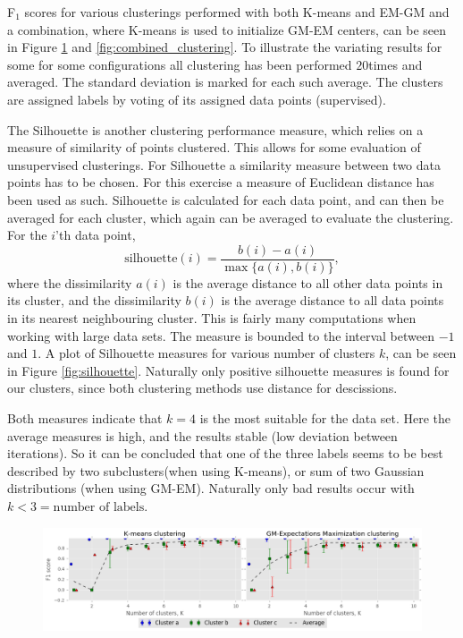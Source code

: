 \documentclass[a4paper,10pt,article,oneside,english]{memoir}
\let\oldcaption\caption
\renewcommand{\caption}[1]{\oldcaption{\emph{#1}}}
\begin{document}
F$_1$ scores for various clusterings performed with both K-means and EM-GM and a combination, where K-means is used to initialize GM-EM centers, can be seen in Figure \ref{fig:f1} and \ref{fig:combined_clustering}. To illustrate the variating results for some for some configurations all clustering has been performed $20$times and averaged. The standard deviation is marked for each such average. The clusters are assigned labels by voting of its assigned data points (supervised).


The Silhouette is another clustering performance measure, which relies on a measure of similarity of points clustered. This allows for some evaluation of unsupervised clusterings. For Silhouette a similarity measure between two data points has to be chosen. For this exercise a measure of Euclidean distance has been used as such. Silhouette is calculated for each data point, and can then be averaged for each cluster, which again can be averaged to evaluate the clustering. For the $i$'th data point,
$$ \text{silhouette}(i) = \frac{b(i) - a(i)}{\max\{a(i), b(i)\}},$$
where the dissimilarity $a(i)$ is the average distance to all other data points in its cluster, and the dissimilarity $b(i)$ is the average distance to all data points in its nearest neighbouring cluster. This is fairly many computations when working with large data sets. The measure is bounded to the interval between $-1$ and $1$. A plot of Silhouette measures for various number of clusters $k$, can be seen in Figure \ref{fig:silhouette}. Naturally only positive silhouette measures is found for our clusters, since both clustering methods use distance for descissions. 

Both measures indicate that $k=4$ is the most suitable for the data set. Here the average measures is high, and the results stable (low deviation between iterations). So it can be concluded that one of the three labels seems to be best described by two subclusters(when using K-means), or sum of two Gaussian distributions (when using GM-EM). Naturally only bad results occur with $k<3=\text{number of labels}$. 

\begin{figure}
	\centering
	\includegraphics[width=\textwidth]{f1_vs_k.png}
	\caption{}
	\label{fig:f1}
\end{figure}
\end{document}
